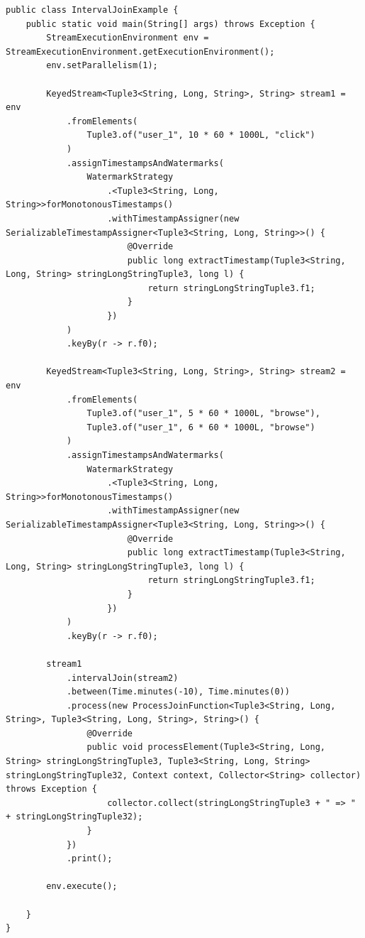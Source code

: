 \documentclass[cn,11pt,chinese]{elegantbook}
\begin{document}
\begin{verbatim}
public class IntervalJoinExample {
    public static void main(String[] args) throws Exception {
        StreamExecutionEnvironment env = StreamExecutionEnvironment.getExecutionEnvironment();
        env.setParallelism(1);

        KeyedStream<Tuple3<String, Long, String>, String> stream1 = env
            .fromElements(
                Tuple3.of("user_1", 10 * 60 * 1000L, "click")
            )
            .assignTimestampsAndWatermarks(
                WatermarkStrategy
                    .<Tuple3<String, Long, String>>forMonotonousTimestamps()
                    .withTimestampAssigner(new SerializableTimestampAssigner<Tuple3<String, Long, String>>() {
                        @Override
                        public long extractTimestamp(Tuple3<String, Long, String> stringLongStringTuple3, long l) {
                            return stringLongStringTuple3.f1;
                        }
                    })
            )
            .keyBy(r -> r.f0);

        KeyedStream<Tuple3<String, Long, String>, String> stream2 = env
            .fromElements(
                Tuple3.of("user_1", 5 * 60 * 1000L, "browse"),
                Tuple3.of("user_1", 6 * 60 * 1000L, "browse")
            )
            .assignTimestampsAndWatermarks(
                WatermarkStrategy
                    .<Tuple3<String, Long, String>>forMonotonousTimestamps()
                    .withTimestampAssigner(new SerializableTimestampAssigner<Tuple3<String, Long, String>>() {
                        @Override
                        public long extractTimestamp(Tuple3<String, Long, String> stringLongStringTuple3, long l) {
                            return stringLongStringTuple3.f1;
                        }
                    })
            )
            .keyBy(r -> r.f0);

        stream1
            .intervalJoin(stream2)
            .between(Time.minutes(-10), Time.minutes(0))
            .process(new ProcessJoinFunction<Tuple3<String, Long, String>, Tuple3<String, Long, String>, String>() {
                @Override
                public void processElement(Tuple3<String, Long, String> stringLongStringTuple3, Tuple3<String, Long, String> stringLongStringTuple32, Context context, Collector<String> collector) throws Exception {
                    collector.collect(stringLongStringTuple3 + " => " + stringLongStringTuple32);
                }
            })
            .print();

        env.execute();

    }
}
\end{verbatim}
\end{document}
